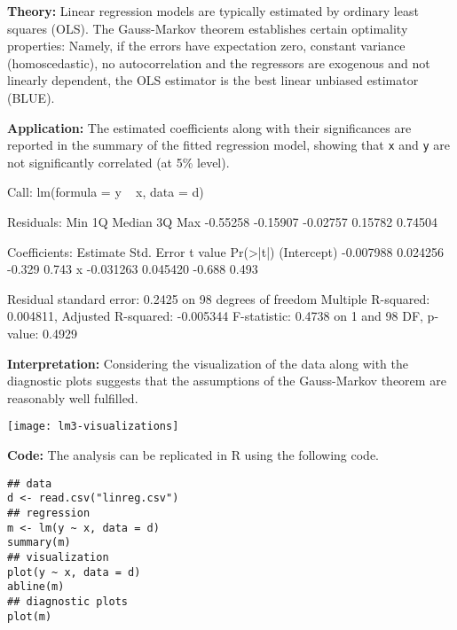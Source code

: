\begin{solution}
\textbf{Theory:} Linear regression models are typically estimated by ordinary least squares (OLS).
The Gauss-Markov theorem establishes certain optimality properties: Namely, if the errors
have expectation zero, constant variance (homoscedastic), no autocorrelation and the
regressors are exogenous and not linearly dependent, the OLS estimator is the best linear
unbiased estimator (BLUE).

\textbf{Application:} The estimated coefficients along with their significances are reported in the
summary of the fitted regression model, showing that \texttt{x} and \texttt{y} are not significantly correlated (at 5\% level).

\begin{Schunk}
\begin{Soutput}
Call:
lm(formula = y ~ x, data = d)

Residuals:
     Min       1Q   Median       3Q      Max 
-0.55258 -0.15907 -0.02757  0.15782  0.74504 

Coefficients:
             Estimate Std. Error t value Pr(>|t|)
(Intercept) -0.007988   0.024256  -0.329    0.743
x           -0.031263   0.045420  -0.688    0.493

Residual standard error: 0.2425 on 98 degrees of freedom
Multiple R-squared:  0.004811,	Adjusted R-squared:  -0.005344 
F-statistic: 0.4738 on 1 and 98 DF,  p-value: 0.4929
\end{Soutput}
\end{Schunk}

\textbf{Interpretation:} Considering the visualization of the data along with the diagnostic plots suggests
that the assumptions of the Gauss-Markov theorem are reasonably well fulfilled.

\texttt{[image: lm3-visualizations]}

\textbf{Code:} The analysis can be replicated in R using the following code.

\begin{verbatim}
## data
d <- read.csv("linreg.csv")
## regression
m <- lm(y ~ x, data = d)
summary(m)
## visualization
plot(y ~ x, data = d)
abline(m)
## diagnostic plots
plot(m)
\end{verbatim}
\end{solution}


